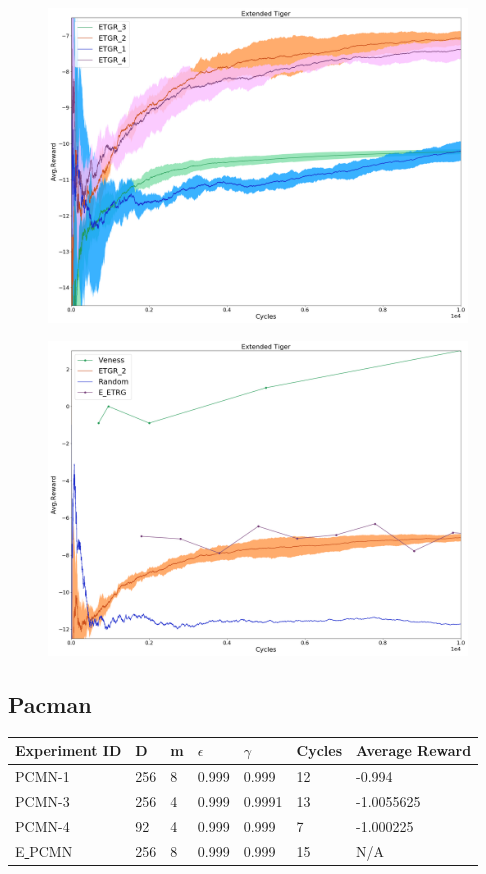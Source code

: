 \documentclass{article}
\theoremstyle{definition}
\newtheorem{primary statistics}[definition]{Primary Statistics}
\newtheorem{auxiliary statistics}[definition]{Auxiliary Statistics}
\begin{document}
 \begin{figure}[!htb]
 \centering
    \includegraphics[width=11.1cm]{4_Extended_Tiger}
\end{figure}

 \begin{figure}[!htb]
 \centering
    \includegraphics[width=11.1cm]{Extended_Tiger}
\end{figure}


\newpage

\subsection{Pacman}
 \begin{tabular}{|l|l|l|l|l|l|l|}
 \hline \centering
 Experiment ID& D & m & $\epsilon$ & $\gamma$ & Cycles & Average Reward \\ \hline
PCMN-1  & 256       & 8           & 0.999       & 0.999             & 12     & -0.994        \\ \hline
 PCMN-3    & 256       & 4           & 0.999       & 0.9991            & 13     & -1.0055625       \\ \hline
 PCMN-4     & 92        & 4           & 0.999       & 0.999             & 7      &    -1.000225    \\  \hline 
  E\underline{ }PCMN    & 256        & 8           & 0.999       & 0.999             & 15      &    N/A    \\  \hline     
\end{tabular} \\
\end{document}
